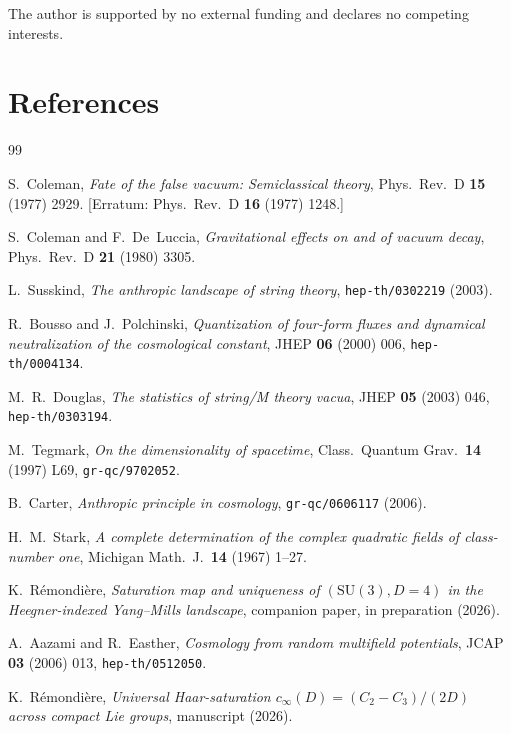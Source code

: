 \documentclass[11pt,a4paper]{article}
\theoremstyle{plain}
\theoremstyle{definition}
\newcommand{\SU}{\mathrm{SU}}
\newcommand{\PRD}{Phys.\ Rev.\ D}
\newcommand{\JHEP}{JHEP}
\begin{document}
The author is supported by no external funding and declares no competing interests.

\section*{References}\label{sec:refs}

\begin{thebibliography}{99}

S.~Coleman,
\emph{Fate of the false vacuum: Semiclassical theory},
\PRD{} \textbf{15} (1977) 2929. [Erratum: \PRD{} \textbf{16} (1977) 1248.]

S.~Coleman and F.~De~Luccia,
\emph{Gravitational effects on and of vacuum decay},
\PRD{} \textbf{21} (1980) 3305.

L.~Susskind,
\emph{The anthropic landscape of string theory},
\texttt{hep-th/0302219} (2003).

R.~Bousso and J.~Polchinski,
\emph{Quantization of four-form fluxes and dynamical neutralization of the cosmological constant},
\JHEP{} \textbf{06} (2000) 006,
\texttt{hep-th/0004134}.

M.~R.~Douglas,
\emph{The statistics of string/M theory vacua},
\JHEP{} \textbf{05} (2003) 046,
\texttt{hep-th/0303194}.

M.~Tegmark,
\emph{On the dimensionality of spacetime},
Class.\ Quantum Grav.\ \textbf{14} (1997) L69,
\texttt{gr-qc/9702052}.

B.~Carter,
\emph{Anthropic principle in cosmology},
\texttt{gr-qc/0606117} (2006).

H.~M.~Stark,
\emph{A complete determination of the complex quadratic fields of class-number one},
Michigan Math.\ J.\ \textbf{14} (1967) 1--27.

K.~R\'emondi\`ere,
\emph{Saturation map and uniqueness of $(\SU(3),D{=}4)$ in the Heegner-indexed Yang--Mills landscape},
companion paper, in preparation (2026).

A.~Aazami and R.~Easther,
\emph{Cosmology from random multifield potentials},
JCAP \textbf{03} (2006) 013,
\texttt{hep-th/0512050}.

K.~R\'emondi\`ere,
\emph{Universal Haar-saturation $c_\infty(D)=(C_2-C_3)/(2D)$ across compact Lie groups},
manuscript (2026).


\end{thebibliography}
\end{document}
